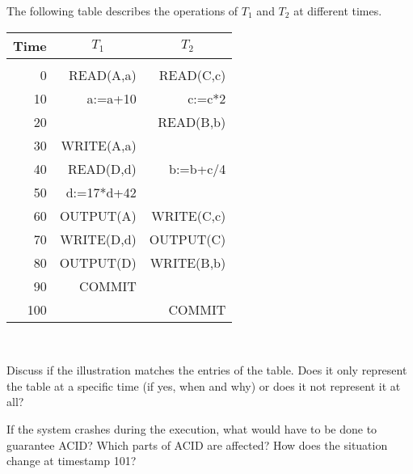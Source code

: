 \begin{enumerate}
\begin{center}
  \end{center}
  \vspace{-0.15cm}

The following table describes the operations of $T_1$ and $T_2$ at different times. \\[0mm]

\vspace{-0.15cm}

\begin{center}
\begin{tabular}{r|rr} 
\multicolumn{1}{r}{Time} & \multicolumn{1}{c}{$T_1$} & \multicolumn{1}{c}{$T_2$} \\ \hline
\multicolumn{3}{c}{} \\
\ 0 & READ(A,a)  & READ(C,c) \\
10  & a:=a+10    & c:=c*2 \\
20  &            & READ(B,b) \\
30  & WRITE(A,a) &  \\
40  & READ(D,d)  & b:=b+c/4 \\
50  & d:=17*d+42 &  \\
60  & OUTPUT(A)  & WRITE(C,c) \\
70  & WRITE(D,d) & OUTPUT(C) \\
80  & OUTPUT(D)  & WRITE(B,b) \\
90  & COMMIT     & \\
100  &            & COMMIT \\
\end{tabular} \\[10mm]
\end{center}

Discuss if the illustration matches the entries of the table. Does it only represent the table at a specific time (if yes, when and why) or does it not represent it at all?

If the system crashes during the execution, what would have to be done to guarantee ACID?
Which parts of ACID are affected?
How does the situation change at timestamp 101?

\end{enumerate}

